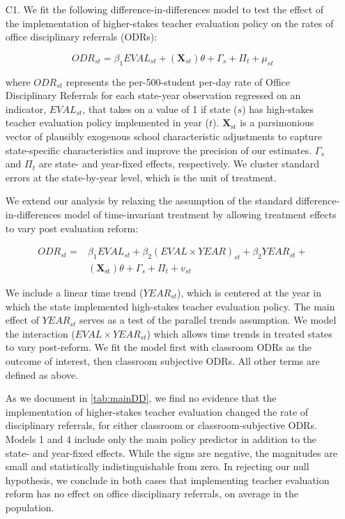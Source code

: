 \documentclass[a4paper, 11pt]{article}
\begin{document}
\begin{enumerate}
	\item[C1.] We fit the following difference-in-differences model to test the effect of the implementation of higher-stakes teacher evaluation policy on the rates of office disciplinary referrals (ODRs):

\begin{equation} \label{eq:1}
ODR_{st}=\beta_{1} EVAL_{st}+\left(\mathbf{X}_{st}\right) \theta+\Gamma_{s}+\Pi_{t}+\mu_{st} 
\end{equation}

where $ODR_{st}$ represents the per-500-student per-day rate of Office Disciplinary Referrals for each state-year observation regressed on an indicator, $EVAL_{st}$, that takes on a value of 1 if state ($s$) has high-stakes teacher evaluation policy implemented in year ($t$). $\mathbf{X}_{\mathrm{st}}$ is a parsimonious vector of plausibly exogenous school characteristic adjustments to capture state-specific characteristics and improve the precision of our estimates. $\Gamma_s$ and $\Pi_t$ are state- and year-fixed effects, respectively. We cluster standard errors at the state-by-year level, which is the unit of treatment.

We extend our analysis by relaxing the assumption of the standard difference-in-differences model of time-invariant treatment by allowing treatment effects to vary post evaluation reform:

\begin{equation} \label{eq:2}
\begin{aligned} 
ODR_{st}= & \beta_{1} EVAL_{st}+\beta_{2} (EVAL \times YEAR)_{st}+\beta_{2} YEAR_{st}+ \\
& \left(\mathbf{X}_{\mathrm{st}}\right) \theta+\Gamma_{s}+\Pi_{t}+v_{st}
\end{aligned}
\end{equation}

We include a linear time trend ($YEAR_{st}$), which is centered at the year in which the state implemented high-stakes teacher evaluation policy. The main effect of $YEAR_{st}$ serves as a test of the parallel trends assumption. We model the interaction ($EVAL\times YEAR_{st}$) which allows time trends in treated states to vary post-reform. We fit the model first with classroom ODRs as the outcome of interest, then classroom subjective ODRs. All other terms are defined as above.

As we document in \autoref{tab:mainDD}, we find no evidence that the implementation of higher-stakes teacher evaluation changed the rate of disciplinary referrals, for either classroom or classroom-subjective ODRs. Models 1 and 4 include only the main policy predictor in addition to the state- and year-fixed effects. While the signs are negative, the magnitudes are small and statistically indistinguishable from zero. In rejecting our null hypothesis, we conclude in both cases that implementing teacher evaluation reform has no effect on office disciplinary referrals, on average in the population. 


\end{enumerate}
\end{document}
